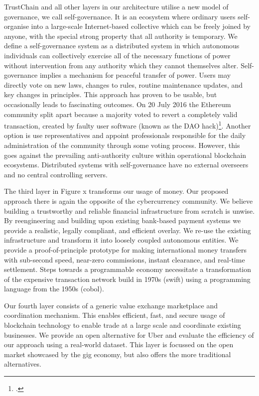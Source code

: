 \documentclass[USenglish]{article}
\begin{document}
TrustChain and all other layers in our architecture utilise a new model of governance, we call self-governance.
It is an ecosystem where ordinary users self-organise into a large-scale Internet-based collective which can be freely joined by anyone, with the special strong property that all authority is temporary.
We define a self-governance system as a distributed system in which autonomous individuals can collectively exercise all of the necessary functions of power without intervention from any authority which they cannot themselves alter.
Self-governance implies a mechanism for peaceful transfer of power. 
Users may directly vote on new laws, changes to rules, routine maintenance updates, and key changes in principles. 
This approach has proven to be usable, but occasionally leads to fascinating outcomes.
On 20 July 2016 the Ethereum community split apart because a majority voted to revert a completely valid transaction, created by faulty user software (known as the DAO hack)\footcite{cryptocomparedao}.
Another option is use representatives and appoint professionals responsible for the daily administration of the community through some voting process.
However, this goes against the prevailing anti-authority culture within operational blockchain ecosystems.
Distributed systems with self-governance have no external overseers and no central controlling servers.

The third layer in Figure x transforms our usage of money.
Our proposed approach there is again the opposite of the cybercurrency community.
We believe building a trustworthy and reliable financial infrastructure from scratch is unwise.
By reengineering and building upon existing bank-based payment systems we provide a realistic, legally compliant, and efficient overlay.
We re-use the existing infrastructure and transform it into loosely coupled autonomous entities.
We provide a proof-of-principle prototype for making international money transfers with sub-second speed, near-zero commissions, instant clearance, and real-time settlement. 
Steps towards a programmable economy necessitate a transformation of the expensive transaction network build in 1970s (swift) using a programming language from the 1950s (cobol).

Our fourth layer consists of a generic value exchange marketplace and coordination mechanism.
This enables efficient, fast, and secure usage of blockchain technology to enable trade at a large scale and coordinate existing businesses.
We provide an open alternative for Uber and evaluate the efficiency of our approach using a real-world dataset.
This layer is focussed on the open market showcased by the gig economy, but also offers the more traditional alternatives.
\end{document}
